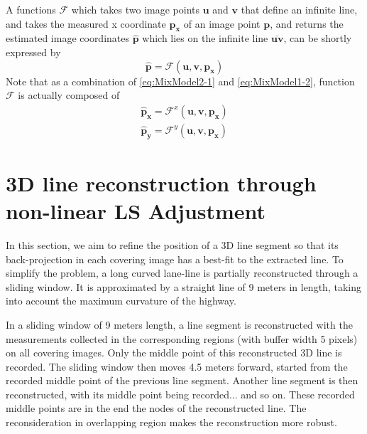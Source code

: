 A functions $\mathcal{F}$ which takes two image points $\mathbf{u}$ and $\mathbf{v}$ that define an infinite line, and takes the measured x coordinate $\mathbf{p_x}$ of an image point $\mathbf{p}$, and returns the estimated image coordinates $\mathbf{\hat{p}}$ which lies on the infinite line $\overline{\mathbf{u}\mathbf{v}}$, can be shortly expressed by
\begin{equation} \label{eq:Ffunction}
\mathbf{\hat{p}} = \mathcal{F}(\mathbf{u},\mathbf{v},\mathbf{p_x})
\end{equation}
Note that as a combination of \eqref{eq:MixModel2-1} and \eqref{eq:MixModel1-2}, function $\mathcal{F}$ is actually composed of
\begin{equation} \label{eq:Ffunction_xy}
\begin{split}
\mathbf{\hat{p}_x} = \mathcal{F}^x(\mathbf{u},\mathbf{v},\mathbf{p_x})\\
\mathbf{\hat{p}_y} = \mathcal{F}^y(\mathbf{u},\mathbf{v},\mathbf{p_x})
\end{split}
\end{equation}


\clearpage
\section{3D line reconstruction through non-linear LS Adjustment}
\label{sec:LSadj}

In this section, we aim to refine the position of a 3D line segment so that its back-projection in each covering image has a best-fit to the extracted line. To simplify the problem, a long curved lane-line is partially reconstructed through a sliding window. It is approximated by a straight line of 9 meters in length, taking into account the maximum curvature of the highway.

In a sliding window of 9 meters length, a line segment is reconstructed with the measurements collected in the corresponding regions (with buffer width 5 pixels) on all covering images. Only the middle point of this reconstructed 3D line is recorded. The sliding window then moves 4.5 meters forward, started from the recorded middle point of the previous line segment. Another line segment is then reconstructed, with its middle point being recorded... and so on. These recorded middle points are in the end the nodes of the reconstructed line. The reconsideration in overlapping region makes the reconstruction more robust.

